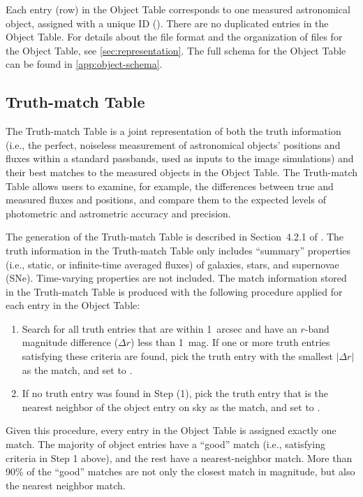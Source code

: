 \documentclass[modern]{descnote}
\begin{document}
Each entry (row) in the Object Table corresponds to one measured astronomical object, assigned with a unique ID (). There are no duplicated entries in the Object Table. For details about the file format and the organization of files for the Object Table, see \autoref{sec:representation}. The full schema for the Object Table can be found in \autoref{app:object-schema}. 

\subsection{Truth-match Table}
\label{sec:truth}

The Truth-match Table is a joint representation of both the truth information (i.e., the perfect, noiseless measurement of astronomical objects' positions and fluxes within a standard passbands, used as inputs to the image simulations) and their best matches to the measured objects in the Object Table. The Truth-match Table allows users to examine, for example, the differences between true and measured fluxes and positions, and compare them to the expected levels of photometric and astrometric accuracy and precision.

The generation of the Truth-match Table is described in Section~4.2.1 of \cite{2020arXiv201005926L}. The truth information in the Truth-match Table only includes ``summary'' properties (i.e., static, or infinite-time averaged fluxes) of galaxies, stars, and supernovae (SNe). Time-varying properties are not included. The match information stored in the  Truth-match Table is produced with the following procedure applied for each entry in the Object Table:
\begin{enumerate}
    \item Search for all truth entries that are within 1~arcsec and have an $r$-band magnitude difference ($\Delta r$) less than 1~mag. If one or more truth entries satisfying these criteria are found, pick the truth entry with the smallest $|\Delta r|$ as the match, and set  to .
    \item If no truth entry was found in Step (1), pick the truth entry that is the nearest neighbor of the object entry on sky as the match, and set  to .
\end{enumerate}
Given this procedure, every entry in the Object Table is assigned exactly one match. The majority of object entries have a ``good'' match (i.e., satisfying criteria in Step 1 above), and the rest have a nearest-neighbor match. More than 90\% of the ``good'' matches are not only the closest match in magnitude, but also the nearest neighbor match. 
\end{document}
